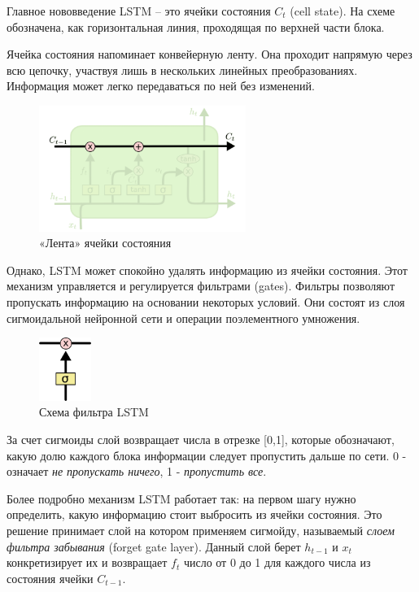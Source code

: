 	Главное нововведение LSTM – это ячейки состояния $C_t$ (cell state). На схеме обозначена, как горизонтальная линия, проходящая по верхней части блока.
	
	Ячейка состояния напоминает конвейерную ленту. Она проходит напрямую через всю цепочку, участвуя лишь в нескольких линейных преобразованиях. Информация может легко передаваться по ней без изменений.
	
	\begin{figure}[h]
		\centering
		\captionsetup{justification=centering}
		\includegraphics[width=0.6\textwidth]{img/LSTM 1.png}
		\caption{«Лента» ячейки состояния}
	\end{figure}
	
	Однако, LSTM может спокойно удалять информацию из ячейки состояния. Этот механизм управляется и регулируется фильтрами (gates). Фильтры позволяют пропускать информацию на основании некоторых условий. Они состоят из слоя сигмоидальной нейронной сети и операции поэлементного умножения.
	
	\begin{figure}[h]
		\centering
		\captionsetup{justification=centering}
		\includegraphics[width=0.15\textwidth]{img/Gates.png}
		\caption{Схема фильтра LSTM}
	\end{figure}
	
	За счет сигмоиды слой возвращает числа в отрезке [0,1], которые обозначают, какую долю каждого блока информации следует пропустить дальше по сети. 0 - означает \textit{не пропускать ничего}, 1 - \textit{пропустить все}.
    
    Более подробно механизм LSTM работает так: на первом шагу нужно определить, какую информацию стоит выбросить из ячейки состояния. Это решение принимает слой на котором применяем сигмойду, называемый \textit{слоем фильтра забывания} (forget gate layer). Данный слой берет $h_{t-1}$ и $x_t$ конкретизирует их и возвращает $f_t$ число от 0 до 1 для каждого числа из состояния ячейки $C_{t-1}$.
    
